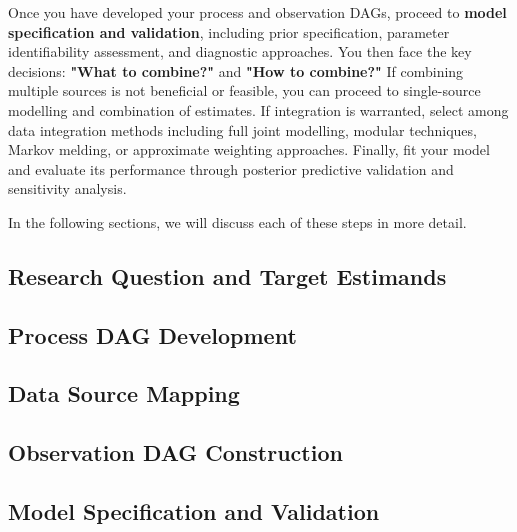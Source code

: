 \documentclass{article}
\begin{document}
Once you have developed your process and observation DAGs, proceed to \textbf{model specification and validation}, including prior specification, parameter identifiability assessment, and diagnostic approaches.
You then face the key decisions: \textbf{"What to combine?"} and \textbf{"How to combine?"}
If combining multiple sources is not beneficial or feasible, you can proceed to single-source modelling and combination of estimates.
If integration is warranted, select among data integration methods including full joint modelling, modular techniques, Markov melding, or approximate weighting approaches.
Finally, fit your model and evaluate its performance through posterior predictive validation and sensitivity analysis.

In the following sections, we will discuss each of these steps in more detail.

\subsection{Research Question and Target Estimands}

\subsection{Process DAG Development}

\subsection{Data Source Mapping}

\subsection{Observation DAG Construction}

\subsection{Model Specification and Validation}
\end{document}
